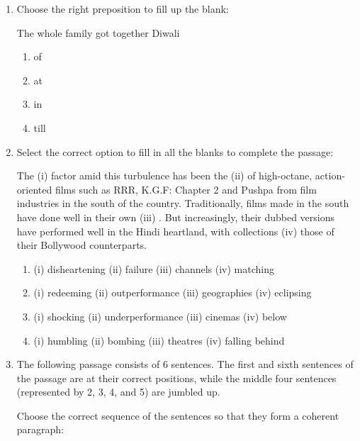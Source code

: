 \documentclass[journal,13pt,onecolumn]{exam}
\theoremstyle{remark}
\begin{document}
\begin{enumerate}[label=Q.\arabic*]
\item Choose the right preposition to fill up the blank:

The whole family got together \underline{\hspace{1cm}} Diwali

\begin{enumerate}
    \item of
    \item at
    \item in
    \item till
\end{enumerate}


\item Select the correct option to fill in all the blanks to complete the passage:

The (i) \underline{\hspace{1.5cm}} factor amid this turbulence has been the (ii) \underline{\hspace{1.5cm}} of high-octane, action-oriented films such as RRR, K.G.F: Chapter 2 and Pushpa from film industries in the south of the country. Traditionally, films made in the south have done well in their own (iii) \underline{\hspace{1.5cm}}. But increasingly, their dubbed versions have performed well in the Hindi heartland, with collections (iv) \underline{\hspace{1.5cm}} those of their Bollywood counterparts.

\begin{enumerate}[label=(\Alph*)]
    \item (i) disheartening (ii) failure (iii) channels (iv) matching
    \item (i) redeeming (ii) outperformance (iii) geographies (iv) eclipsing
    \item (i) shocking (ii) underperformance (iii) cinemas (iv) below
    \item (i) humbling (ii) bombing (iii) theatres (iv) falling behind
\end{enumerate}
\newpage
\item The following passage consists of 6 sentences. The first and sixth sentences of the passage are at their correct positions, while the middle four sentences (represented by 2, 3, 4, and 5) are jumbled up.

Choose the correct sequence of the sentences so that they form a coherent paragraph:


\end{enumerate}
\end{document}
